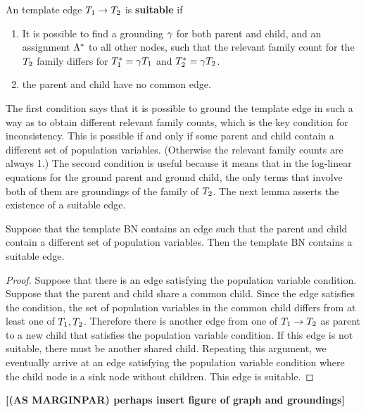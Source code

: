 \documentclass[runningheads,a4paper]{llncs}
\renewcommand{\marginpar}[1]{\fixneeded{(AS MARGINPAR) #1}}
\newcommand{\fixneeded}[1]{\textbf{[\footnotesize #1]}}
\begin{document}
\begin{definition} \label{def:suitable}
An template edge $T_{1} \rightarrow T_{2}$ is \textbf{suitable} if

\begin{enumerate}
\item It is possible to find a grounding $\gamma$ for both parent and child, and an assignment $\Lambda^{*}\hspace{0.0ex}$ to all other nodes, such that the relevant family count for the $T_{2}$ family differs for $T_{1}^{*}\hspace{0.0ex} = \gamma T_{1}$ 
and $T_{2}^{*}\hspace{0.0ex} = \gamma T_{2}$.
\item the parent and child have no common edge.
\end{enumerate}
\end{definition}

The first condition says that it is possible to ground the template edge in such a way as to obtain different relevant family counts, which is the key condition for inconsistency. This is possible if and only if some parent and child contain a different set of population variables. (Otherwise the relevant family counts are always 1.) The second condition is useful because it means that in the log-linear equations for the ground parent and ground child, the only terms that involve both of them are groundings of the family of $T_{2}$. The next lemma asserts the existence of a suitable edge. 

\begin{lemma}
Suppose that the template BN contains an edge such that the parent and child contain a different set of population variables. Then the template BN contains a suitable edge.
\end{lemma}
\begin{proof}
Suppose that there is an edge satisfying the population variable condition. Suppose that the parent and child share a common child. Since the edge satisfies the condition, the set of population variables in the common child differs from at least one of  $T_{1}, T_{2}$. Therefore there is another edge from one of  $T_{1} \rightarrow T_{2}$ as parent to a new child that satisfies the population variable condition. If this edge is not suitable, there must be another shared child. Repeating this argument, we eventually arrive at an edge satisfying the population variable condition  where the child node is a sink node without children. This edge is suitable.
\end{proof}
\marginpar{perhaps insert figure of graph and groundings}
\end{document}
